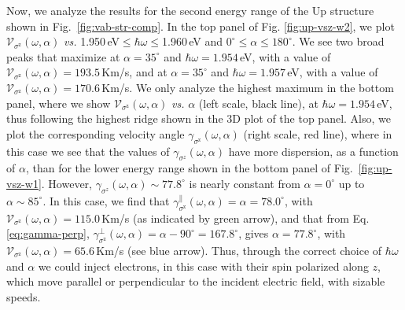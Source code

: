 \documentclass[floatfix,prb,aps,superscriptaddress,showpacs,11pt,preprint,letterpaper]{revtex4}
\begin{document}
Now, we analyze the results for the second energy range of the Up structure
shown in Fig.~\ref{fig:vab-str-comp}. In the top panel
of Fig. \ref{fig:up-vsz-w2}, we plot $\mathcal{V}_{\sigma^{\mathrm{z}}}
(\omega,\alpha)$ {\it vs.} 1.950\,eV$\leq\hbar\omega\leq$1.960\,eV and
$0^\circ\leq\alpha\leq 180^\circ$. We see two broad peaks that maximize at
$\alpha=35^{\circ}$ and $\hbar\omega= 1.954$\,eV, with a value of
$\mathcal{V}_{\sigma^{\mathrm{z}}}(\omega,\alpha) = 193.5$\,Km/s, and at
$\alpha=35^{\circ}$ and $\hbar\omega= 1.957$\,eV, with a value of
$\mathcal{V}_{\sigma^{\mathrm{z}}}(\omega,\alpha) = 170.6$\,Km/s. We only
analyze the highest  maximum in the bottom panel, where we  show
$\mathcal{V}_{\sigma^{\mathrm{z}}} (\omega,\alpha)$ {\it vs.} $\alpha$ (left scale,
black line), at $\hbar\omega= 1.954$\,eV, thus following the highest ridge
shown in the 3D plot of the top panel. Also, we plot the corresponding velocity
angle $\gamma_{\sigma^\mathrm{z}}(\omega,\alpha)$ (right scale, red line),
where in this case we see that the values of $\gamma_{\sigma^z}(\omega,\alpha)$
have more dispersion, as a function of $\alpha$, than for the lower energy
range shown in the bottom panel of Fig.~\ref{fig:up-vsz-w1}. However,
$\gamma_{\sigma^z}(\omega,\alpha)\sim 77.8^\circ$ is nearly constant from
$\alpha=0^\circ$ up to $\alpha\sim 85^\circ$. In this case, we find that
$\gamma^\parallel_{\sigma^\mathrm{z}}(\omega,\alpha)=\alpha=78.0^\circ$, with
$\mathcal{V}_{\sigma^{\mathrm{z}}}(\omega,\alpha) = 115.0$\,Km/s (as indicated
by green arrow), and that from Eq. \eqref{eq:gamma-perp},
$\gamma^\perp_{\sigma^\mathrm{z}}(\omega,\alpha)=\alpha-90^\circ=167.8^\circ$,
gives $\alpha=77.8^\circ$, with
$\mathcal{V}_{\sigma^{\mathrm{z}}}(\omega,\alpha) = 65.6$\,Km/s (see blue
arrow). Thus, through the correct choice of $\hbar\omega$ and $\alpha$ we could
inject electrons, in this case with their spin polarized along $z$, which move
parallel or perpendicular to the incident electric field, with sizable speeds.
\end{document}
